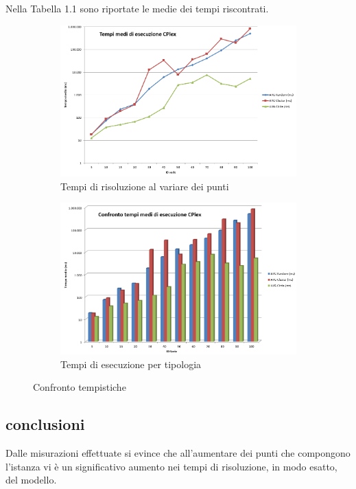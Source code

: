 Nella Tabella 1.1 sono riportate le medie dei tempi riscontrati.

\begin{figure}
\centering
\begin{subfigure}[b]{0.9\textwidth}
\includegraphics[width=\textwidth]{Images/Part_1/graphics/Times01.png}
\caption{Tempi di risoluzione al variare dei punti}
\label{pt1:time:time01}
\end{subfigure}

\begin{subfigure}[b]{0.9\textwidth}
\includegraphics[width=\textwidth]{Images/Part_1/graphics/Times02.png}
\caption{Tempi di esecuzione per tipologia}
\label{pt1:time:time02}
\end{subfigure}
\caption{Confronto tempistiche}
\label{pt1:time:times}
\end{figure}

\subsection[Conclusioni]{conclusioni}
\label{pt1:time:conclusion}
Dalle misurazioni effettuate si evince che all'aumentare dei punti che compongono l'istanza vi è un significativo aumento nei tempi di risoluzione, in modo esatto, del modello.

